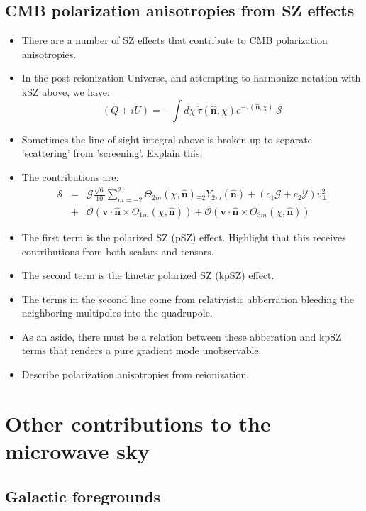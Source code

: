 \documentclass[aps,nofootinbib,groupedaddress]{revtex4}
\begin{document}
\subsection{CMB polarization anisotropies from SZ effects}
\begin{itemize}
\item There are a number of SZ effects that contribute to CMB polarization anisotropies. 
\item In the post-reionization Universe, and attempting to harmonize notation with kSZ above, we have:
\begin{equation}
(Q \pm iU) = -\int d\chi \ \dot{\tau} (\mathbf{\hat{n}}, \chi) e^{-\tau (\mathbf{\hat{n}}, \chi)} \ \mathcal{S}
\end{equation}
\item Sometimes the line of sight integral above is broken up to separate 'scattering' from 'screening'. Explain this.
\item The contributions are:
\begin{eqnarray}
\mathcal{S} &=& \mathcal{G} \frac{\sqrt{6}}{10} \sum_{m=-2}^2  \Theta_{2 m} (\chi, \mathbf{\hat{n}}) {}_{\mp 2} Y_{2m} (\mathbf{\hat{n}}) + (c_1 \mathcal{G} + c_2 \mathcal{Y}) v_{\perp}^2 \\ 
&+& \mathcal{O} (\mathbf{v}\cdot\mathbf{\hat{n}} \times \Theta_{1 m} (\chi, \mathbf{\hat{n}})) +  \mathcal{O} (\mathbf{v}\cdot\mathbf{\hat{n}} \times \Theta_{3 m} (\chi, \mathbf{\hat{n}})) 
 \end{eqnarray}
\item The first term is the polarized SZ (pSZ) effect. Highlight that this receives contributions from both scalars and tensors.
\item The second term is the kinetic polarized SZ (kpSZ) effect.
\item The terms in the second line come from relativistic abberration bleeding the neighboring multipoles into the quadrupole.
\item As an aside, there must be a relation between these abberation and kpSZ terms that renders a pure gradient mode unobservable.
\item Describe polarization anisotropies from reionization.
\end{itemize}

\section{Other contributions to the microwave sky}

\subsection{Galactic foregrounds}
\end{document}
